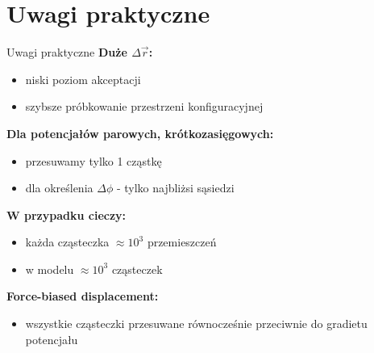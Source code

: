 \section{Uwagi praktyczne}
	\begin{frame}{Uwagi praktyczne}
		\textbf{Duże $\Delta\vec{r}$:}
		\begin{itemize}
			\item niski poziom akceptacji
			\item szybsze próbkowanie przestrzeni konfiguracyjnej
		\end{itemize}
		
		\textbf{Dla potencjałów parowych, krótkozasięgowych:}
		\begin{itemize}
			\item przesuwamy tylko 1 cząstkę
			\item dla określenia $\Delta\phi$ - tylko najbliżsi sąsiedzi
		\end{itemize}
		
		\textbf{W przypadku cieczy:}
		\begin{itemize}
			\item każda cząsteczka $\approx 10^3$ przemieszczeń
			\item w modelu $\approx 10^3$ cząsteczek
		\end{itemize}	
		
		\textbf{Force-biased displacement:}
		\begin{itemize}
			\item wszystkie cząsteczki przesuwane równocześnie przeciwnie do gradietu potencjału
		\end{itemize}
		
	\end{frame}